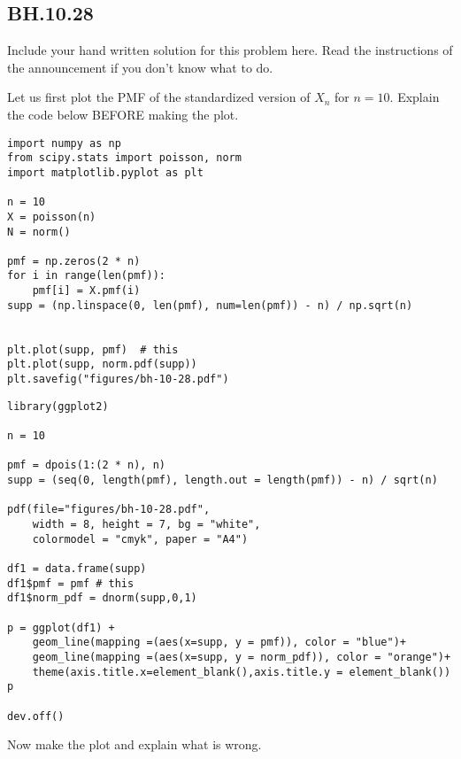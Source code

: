 

\subsection{BH.10.28}

\begin{exercise}
Include your hand written solution for this problem here. Read the instructions of the announcement if you don't know what to do.
\end{exercise}

\begin{exercise}
Let us first plot the PMF of the standardized version of $X_{n}$ for $n=10$. Explain the code below BEFORE making the plot.
\end{exercise}

\begin{verbatim}
import numpy as np
from scipy.stats import poisson, norm
import matplotlib.pyplot as plt

n = 10
X = poisson(n)
N = norm()

pmf = np.zeros(2 * n)
for i in range(len(pmf)):
    pmf[i] = X.pmf(i)
supp = (np.linspace(0, len(pmf), num=len(pmf)) - n) / np.sqrt(n)


plt.plot(supp, pmf)  # this
plt.plot(supp, norm.pdf(supp))
plt.savefig("figures/bh-10-28.pdf")
\end{verbatim}

\begin{verbatim}
library(ggplot2)

n = 10

pmf = dpois(1:(2 * n), n)
supp = (seq(0, length(pmf), length.out = length(pmf)) - n) / sqrt(n)

pdf(file="figures/bh-10-28.pdf",
    width = 8, height = 7, bg = "white",
    colormodel = "cmyk", paper = "A4")

df1 = data.frame(supp)
df1$pmf = pmf # this
df1$norm_pdf = dnorm(supp,0,1)

p = ggplot(df1) +
    geom_line(mapping =(aes(x=supp, y = pmf)), color = "blue")+
    geom_line(mapping =(aes(x=supp, y = norm_pdf)), color = "orange")+
    theme(axis.title.x=element_blank(),axis.title.y = element_blank())
p

dev.off()
\end{verbatim}

\begin{exercise}
Now make the plot and  explain what is wrong.
\end{exercise}


